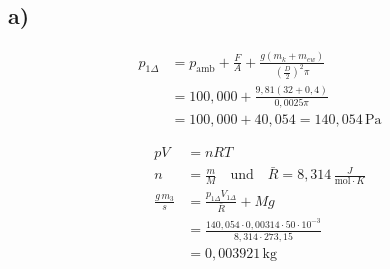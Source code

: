 

\subsection*{a)}
\begin{align*}
p_{1\Delta} &= p_{\text{amb}} + \frac{F}{A} + \frac{g(m_k + m_{ew})}{\left(\frac{D}{2}\right)^2 \pi} \\
&= 100{,}000 + \frac{9{,}81(32 + 0{,}4)}{0{,}0025 \pi} \\
&= 100{,}000 + 40{,}054 = 140{,}054 \, \text{Pa}
\end{align*}

\begin{align*}
pV &= nRT \\
n &= \frac{m}{M} \quad \text{und} \quad \bar{R} = 8{,}314 \, \frac{J}{\text{mol} \cdot K} \\
\frac{g \, m_3}{s} &= \frac{p_{1\Delta} V_{1\Delta}}{\bar{R}} + Mg \\
&= \frac{140{,}054 \cdot 0{,}00314 \cdot 50 \cdot 10^{-3}}{8{,}314 \cdot 273{,}15} \\
&= 0{,}003921 \, \text{kg}
\end{align*}